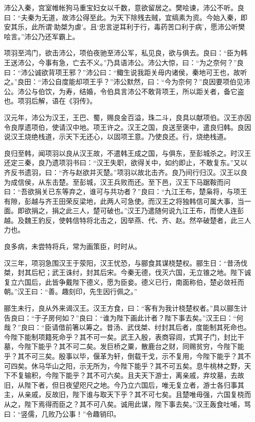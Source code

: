 \documentclass[12pt,UTF8]{ctexbook}
\begin{document}
沛公入秦，宫室帷帐狗马重宝妇女以千数，意欲留居之。樊哙谏，沛公不听。良曰：“夫秦为无道，故沛公得至此。为天下除残去贼，宜缟素为资。今始入秦，即安其乐，此所谓‘助桀为虐’。且‘忠言逆耳利于行，毒药苦口利于病’，愿沛公听樊哙言。”沛公乃还军霸上。



项羽至鸿门，欲击沛公，项伯夜驰至沛公军，私见良，欲与俱去。良曰：“臣为韩王送沛公，今事有急，亡去不义。”乃具语沛公。沛公大惊，曰：“为之奈何？”良曰：“沛公诚欲背项王邪？”沛公曰：“鲰生说我距关毋内诸侯，秦地可王也，故听之。”良田：“沛公自度能却项王乎？”沛公默然，曰：“今为奈何？”良因要项伯见沛公。沛公与伯饮，为寿，结婚，令伯具言沛公不敢背项王，所以距关者，备它盗也。项羽后解，语在《羽传》。



汉元年，沛公为汉王，王巴、蜀，赐良金百溢，珠二斗，良具以献项伯。汉王亦因令良厚遗项伯，使请汉中地。项王许之。汉王之国，良送至褒中，遣良归韩。良因说汉王烧绝栈道，示天下无还心，以固项王意。乃使良还。行，烧绝栈道。



良归至韩，闻项羽以良从汉王故，不遣韩王成之国，与俱东，至彭城杀之。时汉王还定三秦，良乃遗项羽书曰：“汉王失职，欲得关中，如约即止，不敢复东。”又以齐反书遗羽，曰：“齐与赵欲并灭楚。”项羽以故北击齐。良乃间行归汉。汉王以良为成信侯，从东击楚。至彭城，汉王兵败而还。至下邑，汉王下马踞鞍而问曰：“吾欲捐关已东等弃之，谁可与共功者？”良曰：“九江王布，楚枭将，与项王有隙，彭越与齐王田荣反梁地，此两人可急使。而汉王之将独韩信可属大事，当一面。即欲捐之，捐之此三人，楚可破也。”汉王乃遣随何说九江王布，而使人连彭越。及魏王豹反，使韩信特将北击之，因举燕、代、齐、赵。然卒破楚者，此三人力也。



良多病，未尝特将兵，常为画策臣，时时从。



汉三年，项羽急围汉王于荥阳，汉王忧恐，与郦食其谋桡楚权。郦生日：“昔汤伐桀，封其后杞；武王诛纣，封其后宋。今秦无德，伐灭六国，无立锥之地。陛下诚复立六国后，此皆争戴陛下德义，愿为臣妾。德义已行，南面称伯，楚必敛衽而朝。”汉王曰：“善。趣刻印，先生因行佩之。”



郦生未行，良从外来谒汉王。汉王方食，曰：“客有为我计桡楚权者。”具以郦生计告良曰：“于子房何如？”良曰：“谁为陛下画此计者？陛下事去矣。”汉王曰：“何哉？”良曰：“臣请借前箸以筹之。昔汤、武伐桀、纣封其后者，度能制其死命也。今陛下能制项籍死命乎？其不可一矣。武王入殷，表商容闾，式箕子门，封比干墓，今陛下能乎？其不可二矣。发巨桥之粟，散鹿台之财，同赐贫穷，今陛下能乎？其不可三矣。殷事以毕，偃革为轩，倒载干戈，示不复用，今陛下能乎？其不可四矣。休马华山之阳，示无所为，今陛下能乎？其不可五矣。息牛桃林之野，天下不复输积，今陛下能乎？其不可六矣。且夫天下游士，离亲戚，弃坟墓，去故旧，从陛下者，但日夜望咫尺之地。今乃立六国后，唯无复立者，游士各归事其主，从亲戚，反故旧，陛下谁与取天下乎？其不可七矣。且楚唯毋强，六国复桡而从之，陛下焉得而臣之？其不可八矣。诚用此谋，陛下事去矣。”汉王轰食吐哺，骂曰：“竖儒，几败乃公事！”令趣销印。
\end{document}

